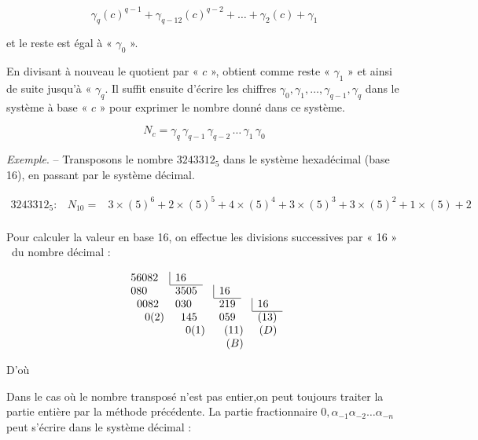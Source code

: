 \[
      \gamma_q(c)^{q-1} +   \gamma_{q-12} (c)^{q-2} + \ldots + \gamma_2 (c) + \gamma_1 
 \]

et le reste est égal à « $\gamma_0$ ».

En divisant à nouveau le quotient par « $c$ », obtient comme reste « $\gamma_1$ » et ainsi de suite jusqu'à  « $\gamma_q$. Il suffit ensuite d'écrire les chiffres $\gamma_0, \gamma_1,\ldots, \gamma_{q-1},\gamma_q$ dans le système à base « $c$ » pour exprimer le nombre donné dans ce système. 

\[ N_c =  \gamma_q\, \gamma_{q-1}\,  \gamma_{q-2}\,\ldots\,\gamma_1 \, \gamma_0 \]  



\textsl{Exemple}. -- Transposons le nombre $3243312_{5}$ dans le système hexadécimal (base
16), en passant par le système décimal.


\[ \begin{array}{rcl}
3243312_{5} :  & N_{10} = & 3\times(5)^{6}+2\times(5)^{5}+4\times(5)^{4}+3\times(5)^{3}+3\times(5)^{2}+1\times(5)+2\\
\end{array} \]


 \centerline {}
 
 \bigskip 
 
Pour calculer la valeur en base 16, on effectue les divisions successives
par « 16 » ~du nombre décimal :


\[ 
\begin{array}{lrcrcr}
56082  & \multicolumn{1}{|l}{16} \\
 \cline{2-2} 
080  & 3505  && \multicolumn{1}{|l}{16} \\
\cline {4-4} 
\;\;0082  & \multicolumn{1}{l}{030} & & 219  & & \multicolumn{1}{|l}{16}\\
\cline {6-6} 
\quad \; 0(2)  & 145  &&  059  &&  (13) \\
\multicolumn{3}{r}{0(1){\;}} & \multicolumn{2}{r}{(11){\;}}   & (D) \\
 & &  & \multicolumn{2}{r}{(B){\;}}   \\
\end{array} 
\]


D'où

\centerline { }

\bigskip 

Dans le cas où le nombre transposé n'est pas entier,on peut toujours traiter la partie entière par la méthode précédente.
La partie fractionnaire $0, \alpha_{-1} \alpha_{-2} \ldots\alpha_{-n}$ peut s'écrire dans le système décimal :

